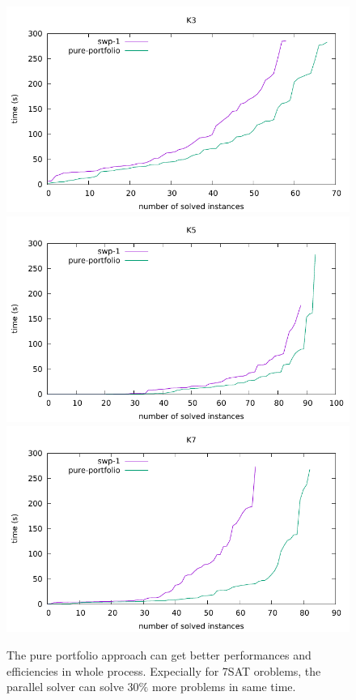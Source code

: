 \documentclass[12pt,a4paper,twoside]{scrartcl}
\numberwithin{equation}{section}
\begin{document}
  \begin{figure}[H]
\begin{center}
  \includegraphics[scale = 0.8]{Parallel/K3/e1.pdf}
    \includegraphics[scale = 0.8]{Parallel/K5/e1.pdf}
  \includegraphics[scale = 0.8]{Parallel/K7/e1.pdf}
  \end{center}
    \label{Experiment 5 all cactus plot}
    \caption{The pure portfolio approach can get better performances and efficiencies in whole process. Expecially for 7SAT oroblems, the parallel solver  can solve $30\%$ more problems in same time. }
  \end{figure}
  \clearpage
\end{document}

